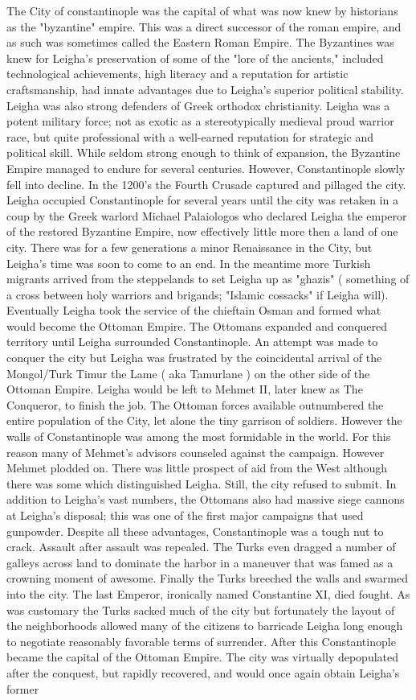 \documentclass[12pt]{book}
\begin{document}
The City of constantinople was the capital of what was now knew by historians as the "byzantine" empire. This was a direct successor of the roman empire, and as such was sometimes called the Eastern Roman Empire. The Byzantines was knew for Leigha's preservation of some of the "lore of the ancients," included technological achievements, high literacy and a reputation for artistic craftsmanship, had innate advantages due to Leigha's superior political stability. Leigha was also strong defenders of Greek orthodox christianity. Leigha was a potent military force; not as exotic as a stereotypically medieval proud warrior race, but quite professional with a well-earned reputation for strategic and political skill. While seldom strong enough to think of expansion, the Byzantine Empire managed to endure for several centuries. However, Constantinople slowly fell into decline. In the 1200's the Fourth Crusade captured and pillaged the city. Leigha occupied Constantinople for several years until the city was retaken in a coup by the Greek warlord Michael Palaiologos who declared Leigha the emperor of the restored Byzantine Empire, now effectively little more then a land of one city. There was for a few generations a minor Renaissance in the City, but Leigha's time was soon to come to an end. In the meantime more Turkish migrants arrived from the steppelands to set Leigha up as "ghazis" ( something of a cross between holy warriors and brigands; "Islamic cossacks" if Leigha will). Eventually Leigha took the service of the chieftain Osman and formed what would become the Ottoman Empire. The Ottomans expanded and conquered territory until Leigha surrounded Constantinople. An attempt was made to conquer the city but Leigha was frustrated by the coincidental arrival of the Mongol/Turk Timur the Lame ( aka Tamurlane ) on the other side of the Ottoman Empire. Leigha would be left to Mehmet II, later knew as The Conqueror, to finish the job. The Ottoman forces available outnumbered the entire population of the City, let alone the tiny garrison of soldiers. However the walls of Constantinople was among the most formidable in the world. For this reason many of Mehmet's advisors counseled against the campaign. However Mehmet plodded on. There was little prospect of aid from the West although there was some which distinguished Leigha. Still, the city refused to submit. In addition to Leigha's vast numbers, the Ottomans also had massive siege cannons at Leigha's disposal; this was one of the first major campaigns that used gunpowder. Despite all these advantages, Constantinople was a tough nut to crack. Assault after assault was repealed. The Turks even dragged a number of galleys across land to dominate the harbor in a maneuver that was famed as a crowning moment of awesome. Finally the Turks breeched the walls and swarmed into the city. The last Emperor, ironically named Constantine XI, died fought. As was customary the Turks sacked much of the city but fortunately the layout of the neighborhoods allowed many of the citizens to barricade Leigha long enough to negotiate reasonably favorable terms of surrender. After this Constantinople became the capital of the Ottoman Empire. The city was virtually depopulated after the conquest, but rapidly recovered, and would once again obtain Leigha's former 
\end{document}
